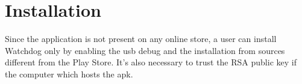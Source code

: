\section{Installation}
\small{Since the application is not present on any online store, a user can install Watchdog only by enabling the usb debug and the installation from sources different from the Play Store. It's also necessary to trust the RSA public key if the computer which hosts the apk.}
